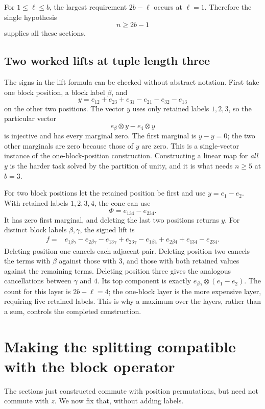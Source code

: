 \documentclass[11pt,a4paper,oneside,openany]{book}
\theoremstyle{definition}\newtheorem{definition}[theorem]{Definition}
\theoremstyle{remark}\newtheorem{remark}[theorem]{Remark}
\numberwithin{equation}{chapter}
\begin{document}
For $1\le \ell\le b$, the largest requirement $2b-\ell$ occurs at $\ell=1$. Therefore the single hypothesis
\begin{equation}\label{tx:eq:linearlabel}n\ge2b-1\end{equation}
supplies all these sections.

\subsection{Two worked lifts at tuple length three}
The signs in the lift formula can be checked without abstract
notation. First take one block position, a block label $\beta$, and
\[
 y=e_{12}+e_{23}+e_{31}-e_{21}-e_{32}-e_{13}
\]
on the other two positions. The vector $y$ uses only retained labels
$1,2,3$, so the particular vector
\[
                    e_\beta\otimes y-e_4\otimes y
\]
is injective and has every marginal zero. The first marginal is
$y-y=0$; the two other marginals are zero because those of $y$ are
zero. This is a single-vector instance of the one-block-position
construction. Constructing a linear map for \emph{all} $y$ is the
harder task solved by the partition of unity, and it is what needs
$n\ge5$ at $b=3$.

For two block positions let the retained position be first and use
$y=e_1-e_2$. With retained labels $1,2,3,4$, the cone can use
\[
                         \Phi=e_{134}-e_{234}.
\]
It has zero first marginal, and deleting the last two positions
returns $y$. For distinct block labels $\beta,\gamma$, the signed
lift is
\begin{align*}
 f={}&e_{1\beta\gamma}-e_{2\beta\gamma}
       -e_{13\gamma}+e_{23\gamma}
       -e_{1\beta4}+e_{2\beta4}
       +e_{134}-e_{234}.
\end{align*}
Deleting position one cancels each adjacent pair. Deleting position
two cancels the terms with $\beta$ against those with $3$, and
those with both retained values against the remaining terms.
Deleting position three gives the analogous cancellations between
$\gamma$ and $4$. Its top component is exactly
$e_{\beta\gamma}\otimes(e_1-e_2)$. The count for this layer is
$2b-\ell=4$; the one-block layer is the more expensive layer, requiring
five retained labels. This is why a maximum over the layers, rather
than a sum, controls the completed construction.

\section{Making the splitting compatible with the block operator}\label{tx:sec:blocksplitting}
The sections just constructed commute with position permutations, but need not commute with $z$. We now fix that, without adding labels.
\end{document}
